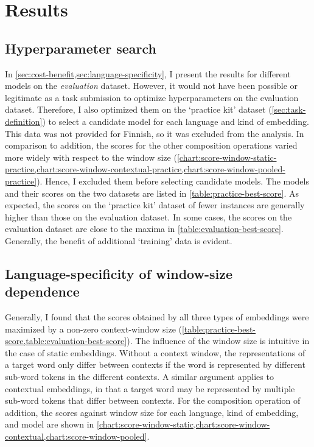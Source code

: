 \section{Results}
\label{sec:results}

\subsection{Hyperparameter search}
\label{sec:hyperparameter-search}



In \cref{sec:cost-benefit,sec:language-specificity}, I present the results for
different models on the \emph{evaluation} dataset.
However, it would not have been possible or legitimate as a task submission to optimize
hyperparameters on the evaluation dataset.
Therefore, I also optimized them on the `practice kit' dataset
(\cref{sec:task-definition}) to select a candidate model for each language and kind of
embedding.
This data was not provided for Finnish, so it was excluded from the analysis.
In comparison to addition, the scores for the other composition operations varied more
widely with respect to the window size
(\cref{chart:score-window-static-practice,chart:score-window-contextual-practice,chart:score-window-pooled-practice}).
Hence, I excluded them before selecting candidate models.
The models and their scores on the two datasets are listed in
\cref{table:practice-best-score}.
As expected, the scores on the `practice kit' dataset of fewer instances are generally
higher than those on the evaluation dataset.
In some cases, the scores on the evaluation dataset are close to the maxima in
\cref{table:evaluation-best-score}.
Generally, the benefit of additional `training' data is evident.



\subsection{Language-specificity of window-size dependence}
\label{sec:language-specificity}

Generally, I found that the scores obtained by all three types of embeddings were
maximized by a non-zero context-window size
(\cref{table:practice-best-score,table:evaluation-best-score}).
The influence of the window size is intuitive in the case of static embeddings.
Without a context window, the representations of a target word only differ between
contexts if the word is represented by different sub-word tokens in the different
contexts.
A similar argument applies to contextual embeddings, in that a target word may be
represented by multiple sub-word tokens that differ between contexts.
For the composition operation of addition, the scores against window size for each
language, kind of embedding, and model are shown in
\cref{chart:score-window-static,chart:score-window-contextual,chart:score-window-pooled}.

